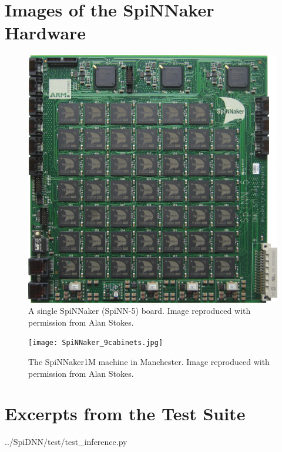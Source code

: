 \documentclass[]{article}
\begin{document}
\begin{appendices} %
\section{Images of the SpiNNaker Hardware}
\label{sec:spinn_photos}

\begin{figure}[H]
  \includegraphics[width=\linewidth]{spinnakerBoard.jpg}
  \caption{A single SpiNNaker (SpiNN-5) board.
  Image reproduced with permission from Alan Stokes.}
\end{figure}

\begin{figure}[H]
  \texttt{[image: SpiNNaker\_9cabinets.jpg]}
  \caption{The SpiNNaker1M machine in Manchester.
  Image reproduced with permission from Alan Stokes.}
\end{figure}

\newpage

\section{Excerpts from the Test Suite}
\label{sec:test_suite}


  {../SpiDNN/test/test_inference.py}


\end{appendices}
\end{document}
